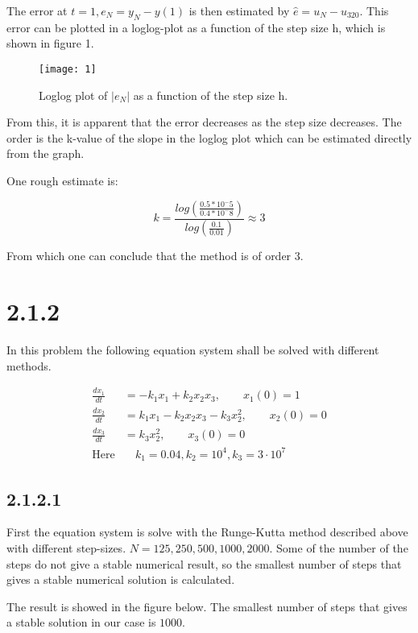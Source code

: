 \documentclass[11pt,a4paper,roman]{scrartcl}
\begin{document}
The error at $t=1,e_N=y_N-y(1)$ is then estimated by $\hat{e}=u_N-u_{320}$. This error can be plotted in a loglog-plot as a function of the step size h, which is shown in figure 1.

\begin{figure}[h]
\texttt{[image: 1]}
\caption{Loglog plot of $|e_N|$ as a function of the step size h.}
\end{figure}

From this, it is apparent that the error decreases as the step size decreases. The order is the k-value of the slope in the loglog plot which can be estimated directly from the graph.

One rough estimate is:

\begin{equation}
k=\frac{log(\frac{0.5*10^-5}{0.4*10^-8})}{log(\frac{0.1}{0.01})}\approx3
\end{equation}

From which one can conclude that the method is of order 3.

\newpage
\section*{2.1.2}
In this problem the following equation system shall be solved with different methods. 

\begin{equation}
\begin{aligned}
\frac{dx_1}{dt} &= -k_1 x_1 + k_2 x_2 x_3, \qquad x_1(0) = 1 \\
\frac{dx_2}{dt} &= k_1 x_1 - k_2 x_2 x_3 - k_3 x_2^2, \qquad x_2(0) = 0 \\
\frac{dx_3}{dt} &= k_3 x_2^2, \qquad x_3(0) = 0 \\
\textrm{Here} & \quad k_1 = 0.04, k_2=10^4, k_3 = 3\cdot 10^7
\end{aligned}
\end{equation}

\subsection*{2.1.2.1}
First the equation system is solve with the Runge-Kutta method described above with different step-sizes. $N = 125, 250, 500, 1000, 2000$. Some of the number of the steps do not give a stable numerical result, so the smallest number of steps that gives a stable numerical solution is calculated. 

The result is showed in the figure below. The smallest number of steps that gives a stable solution in our case is $1000$. 
\end{document}
